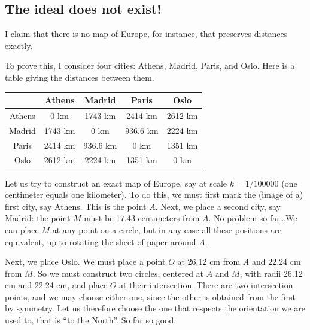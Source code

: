 \documentclass{amsart}
\begin{document}
\subsection{The ideal does not exist!}

I claim that there is no map of Europe, for instance, that preserves distances exactly.

To prove this, I consider four cities: Athens, Madrid, Paris, and
Oslo. Here is a table giving the distances between them.%
\medskip

\begin{center}
  \begin{tabular}{|c||c|c|c|c|}
    \hline
    \mbox{}& Athens & Madrid & Paris & Oslo\\
    \hline\hline
    Athens & 0 km & 1743 km & 2414 km & 2612 km \\
    \hline
    Madrid & 1743 km & 0 km & 936.6 km & 2224 km \\
    \hline
    Paris  & 2414 km & 936.6 km & 0 km & 1351 km \\
    \hline
    Oslo   & 2612 km & 2224 km & 1351 km & 0 km \\
    \hline
  \end{tabular}
\end{center}
\medskip

Let us try to construct an exact map of Europe, say at scale
$k = 1/100000$ (one centimeter equals one kilometer).%
To do this, we must first mark the (image of a) first city, say
Athens. This is the point $A$. Next, we place a second city, say
Madrid: the point $M$ must be 17.43 centimeters from $A$. No problem
so far\dots We can place $M$ at any point on a circle, but in any case
all these positions are equivalent, up to rotating the sheet of paper
around $A$.

Next, we place Oslo. We must place a point $O$ at 26.12 cm from $A$
and 22.24 cm from $M$. So we must construct two circles, centered at
$A$ and $M$, with radii 26.12 cm and 22.24 cm, and place $O$ at their
intersection. There are two intersection points, and we may choose
either one, since the other is obtained from the first by
symmetry. Let us therefore choose the one that respects the
orientation we are used to, that is ``to the North''. So far so good.
\end{document}

